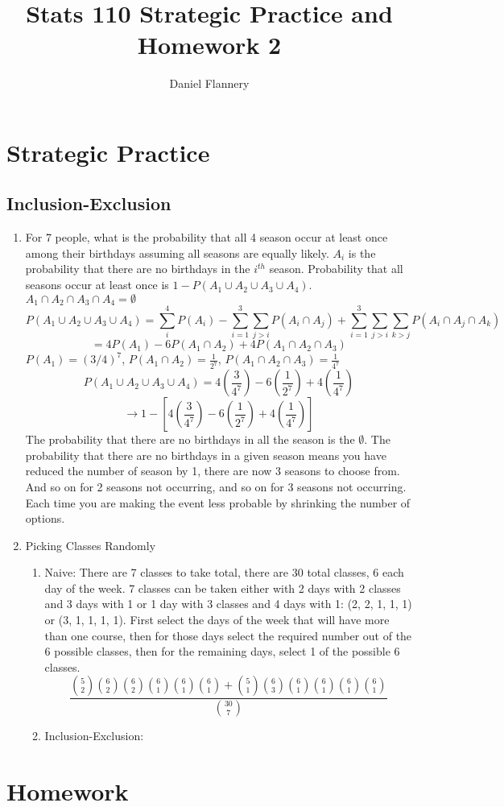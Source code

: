\documentclass[11pt, oneside]{article}   	%
\title{Stats 110 Strategic Practice and Homework 2}
\author{Daniel Flannery}
\begin{document}
\maketitle
\tableofcontents

\section{Strategic Practice}
\subsection{Inclusion-Exclusion}	
	\begin{enumerate}
		\item For 7 people, what is the probability that all 4 season occur at least once among their birthdays assuming all seasons are equally likely.
			$A_i$ is the probability that there are no birthdays in the $i^{th}$ season. Probability that all seasons occur at least once is $1 - P(A_1 \cup A_2 \cup A_3 \cup A_4)$.
			$A_1 \cap A_2 \cap A_3 \cap A_4 = \emptyset$
			\[
				P(A_1 \cup A_2 \cup A_3 \cup A_4) = \sum_{i}^{4}P(A_i) - \sum_{i=1}^{3}\sum_{j > i}P(A_i \cap A_j) + \sum_{i=1}^{3}\sum_{j>i}\sum_{k>j}P(A_i \cap A_j \cap A_k)
			\]
			\[
				= 4P(A_1) - 6P(A_1 \cap A_2) + 4P(A_1 \cap A_2 \cap A_3)
			\]
			$P(A_1) = (3 / 4)^{7}$,
			$P(A_1 \cap A_2) = \frac{1}{2^{7}}$,
			$P(A_1 \cap A_2 \cap A_3) = \frac{1}{4^{7}}$
			\[
				P(A_1 \cup A_2 \cup A_3 \cup A_4)  = 4(\frac{3}{4^{7}}) - 6(\frac{1}{2^{7}}) + 4(\frac{1}{4^{7}})
			\]
			\[
				\rightarrow 1 - [4(\frac{3}{4^{7}}) - 6(\frac{1}{2^{7}}) + 4(\frac{1}{4^{7}})]
			\]
			The probability that there are no birthdays in all the season is the $\emptyset$. The probability that there are no birthdays in a given season means you have reduced the number of season by 1,
			there are now 3 seasons to choose from. And so on for 2 seasons not occurring, and so on for 3 seasons not occurring. Each time you are making the event less probable by shrinking the number of options.
		\item Picking Classes Randomly
			\begin{enumerate}
				\item Naive: There are 7 classes to take total, there are 30 total classes, 6 each day of the week. 7 classes can be taken either with 2 days with 2 classes and 3 days with 1 or 1 day with 3 classes and 4 days with 1:
					(2, 2, 1, 1, 1) or (3, 1, 1, 1, 1). First select the days of the week that will have more than one course, then for those days select the required number out of the 6 possible classes, then for the remaining days, select
					1 of the possible 6 classes.
					\[
						\frac{\binom{5}{2}\binom{6}{2}\binom{6}{2}\binom{6}{1}\binom{6}{1}\binom{6}{1} + \binom{5}{1}\binom{6}{3}\binom{6}{1}\binom{6}{1}\binom{6}{1}\binom{6}{1}}{\binom{30}{7}}
					\]
				\item Inclusion-Exclusion:
			\end{enumerate}
	\end{enumerate}
\pagebreak
\section{Homework}
\end{document}
